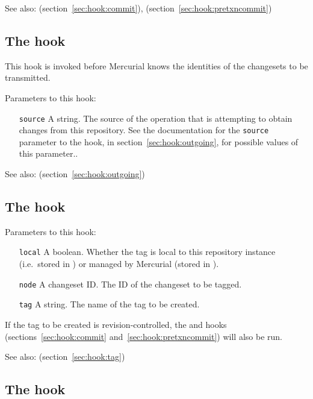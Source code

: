 See also:  (section~\ref{sec:hook:commit}),
 (section~\ref{sec:hook:pretxncommit})

\subsection{The  hook}
\label{sec:hook:preoutgoing}

This hook is invoked before Mercurial knows the identities of the
changesets to be transmitted.

Parameters to this hook:
\begin{itemize}
\item[\texttt{source}] A string.  The source of the operation that is
  attempting to obtain changes from this repository.  See the
  documentation for the \texttt{source} parameter to the
   hook, in section~\ref{sec:hook:outgoing}, for
  possible values of this parameter..
\end{itemize}

See also:  (section~\ref{sec:hook:outgoing})

\subsection{The  hook}
\label{sec:hook:pretag}

Parameters to this hook:
\begin{itemize}
\item[\texttt{local}] A boolean.  Whether the tag is local to this
  repository instance (i.e.~stored in ) or managed
  by Mercurial (stored in ).
\item[\texttt{node}] A changeset ID.  The ID of the changeset to be tagged.
\item[\texttt{tag}] A string.  The name of the tag to be created.
\end{itemize}

If the tag to be created is revision-controlled, the 
and  hooks (sections~\ref{sec:hook:commit}
and~\ref{sec:hook:pretxncommit}) will also be run.

See also:  (section~\ref{sec:hook:tag})

\subsection{The  hook}
\label{sec:hook:pretxnchangegroup}

